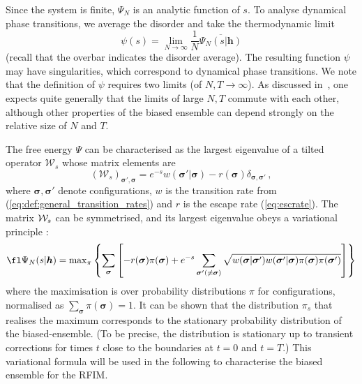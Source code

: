 \documentclass{iopart}
\newcommand{\eqref}[1]{(\ref{#1})}
\begin{document}
Since the system is finite, $\Psi_N$ is an analytic function of $s$.  To analyse 
dynamical phase transitions, we average the disorder and take the thermodynamic limit
\begin{equation}
\psi(s) = \lim_{N\to\infty} \frac{1}{N} \overline{\Psi_N(s|\bm{h})} 
\label{eq:small-psi}
\end{equation}
(recall that the overbar indicates the disorder average).
The resulting function $\psi$ may have singularities, which correspond to dynamical phase transitions.
%
We note that the definition of $\psi$ requires two limits (of $N,T\to\infty$).  
As discussed in~\cite{Jack2019,JackNemoto2019}, one expects quite generally that the limits of large $N,T$ commute with each other, although other properties of the biased ensemble can depend strongly on the relative size of $N$ and $T$.

The free energy $\Psi$ can be characterised as the largest eigenvalue of 
a tilted operator $\mathcal{W}_{s}$ whose matrix elements are
\begin{equation}
  \label{eq:27}
  \left(\mathcal{W}_{ s}\right)_{\bm{\sigma}'\!,\bm{\sigma}} = e^{-s} w(\bm{\sigma}'|\bm{\sigma}) - r(\bm{\sigma})\delta_{\bm{\sigma},\bm{\sigma}'} \, ,
\end{equation}
where $\bm{\sigma},\bm{\sigma}'$ denote configurations, $w$ is the transition rate from \eqref{eq:def:general_transition_rates} and $r$ is the escape rate \eqref{eq:escrate}.
The matrix ${\cal W}_s$ can be symmetrised, and its largest eigenvalue obeys a variational principle \cite[Eq. (27)]{garrahan2009first}:
\begin{equation}
\fl 
  \label{eq:varppl}
  \Psi_N(s|\bm{h}) = {\max}_{\pi} \left\{ \sum_{\bm{\sigma}} \left[ - r(\bm{\sigma})\pi(\bm{\sigma}) + e^{-s} \sum_{\bm{\sigma}'(\neq\bm{\sigma})} \sqrt{w(\bm{\sigma}|\bm{\sigma}')w(\bm{\sigma}'|\bm{\sigma})
  \pi(\bm{\sigma})\pi(\bm{\sigma}')} \right]  \right\} 
\end{equation}
where the maximisation is over probability distributions $\pi$ for configurations, normalised as $\sum_{\bm{\sigma}} \pi(\bm{\sigma})=1$. 
It can be shown \cite{Jack2019,garrahan2009first} that the distribution $\pi_{s}$ that realises the maximum corresponds to the stationary probability distribution of the biased-ensemble. (To be precise, the distribution is stationary up to transient corrections for times $t$ close to the boundaries at $t=0$ and $t=T$.)
This variational formula will be used in the following to characterise the biased ensemble for the RFIM.
\end{document}
